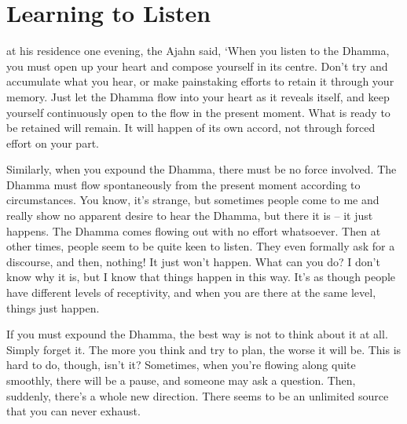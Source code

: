 
\chapter{Learning to Listen}

\vspace*{0.5\baselineskip}
 at his residence one evening, the Ajahn said, `When you listen to the Dhamma, you must open up your heart and compose yourself in its centre. Don't try and accumulate what you hear, or make painstaking efforts to retain it through your memory. Just let the Dhamma flow into your heart as it reveals itself, and keep yourself continuously open to the flow in the present moment. What is ready to be retained will remain. It will happen of its own accord, not through forced effort on your part.

Similarly, when you expound the Dhamma, there must be no force involved. The Dhamma must flow spontaneously from the present moment according to circumstances. You know, it's strange, but sometimes people come to me and really show no apparent desire to hear the Dhamma, but there it is -- it just happens. The Dhamma comes flowing out with no effort whatsoever. Then at other times, people seem to be quite keen to listen. They even formally ask for a discourse, and then, nothing! It just won't happen. What can you do? I don't know why it is, but I know that things happen in this way. It's as though people have different levels of receptivity, and when you are there at the same level, things just happen.

If you must expound the Dhamma, the best way is not to think about it at all. Simply forget it. The more you think and try to plan, the worse it will be. This is hard to do, though, isn't it? Sometimes, when you're flowing along quite smoothly, there will be a pause, and someone may ask a question. Then, suddenly, there's a whole new direction. There seems to be an unlimited source that you can never exhaust.

